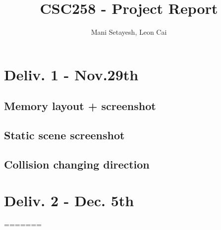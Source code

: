 \documentclass{article}
\author{Mani Setayesh, Leon Cai}
\title{CSC258 - Project Report}
\begin{document}
\maketitle
\section*{Deliv. 1 - Nov.29th}
\subsection*{Memory layout + screenshot}
\subsection*{Static scene screenshot}
\subsection*{Collision changing direction}
\section*{Deliv. 2 - Dec. 5th}
=======
\usepackage{geometry}
\geometry{
    top = 0.75in,
    bottom = 0.75in,
    right = 0.75in,
    left = 0.75in,
}
\usepackage{amsmath}
\usepackage{graphicx}
\usepackage{parskip}
\end{document}
